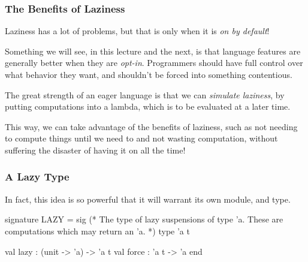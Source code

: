\documentclass[aspectratio=169, handout]{beamer}
\begin{document}
\begin{frame}[fragile]
  \frametitle{The Benefits of Laziness}

  Laziness has a lot of problems, but that is only when it is \textit{on by default}!

  \pause
  \vspace{\fill}

  Something we will see, in this lecture and the next, is that language features are
  generally better when they are \textit{opt-in}. Programmers should have full
  control over what behavior they want, and shouldn't be forced into something
  contentious.

  \pause
  \vspace{\fill}

  The great strength of an eager language is that we can \textit{simulate laziness},
  by putting computations into a lambda, which is to be evaluated at a later time.

  \pause
  \vspace{\fill}

  This way, we can take advantage of the benefits of laziness, such as not needing
  to compute things until we need to and not wasting computation, without
  suffering the disaster of having it on all the time!
\end{frame}


\begin{frame}[fragile]
  \frametitle{A Lazy Type}

  In fact, this idea is so powerful that it will warrant its own module, and type.

  \pause
  \vspace{\fill}

  \begin{codeblock}
    signature LAZY =
      sig
        (* The type of lazy suspensions of type 'a. These are
           computations which may return an 'a.
         *)
        type 'a t

        val lazy : (unit -> 'a) -> 'a t
        val force : 'a t -> 'a
      end
  \end{codeblock}
\end{frame}
\end{document}
